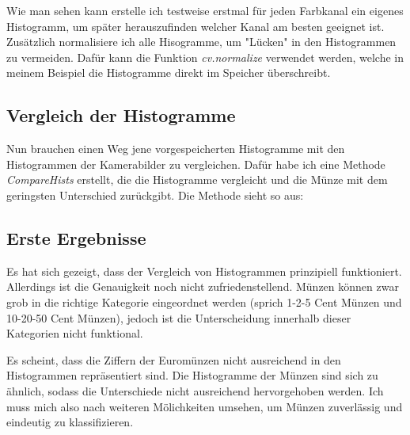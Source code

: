 Wie man sehen kann erstelle ich testweise erstmal für jeden Farbkanal ein eigenes Histogramm, um später herauszufinden welcher Kanal am besten geeignet ist. Zusätzlich normalisiere ich alle Hisogramme, um "Lücken" in den Histogrammen zu vermeiden. Dafür kann die Funktion \textit{cv.normalize} verwendet werden, welche in meinem Beispiel die Histogramme direkt im Speicher überschreibt.

\subsection{Vergleich der Histogramme}
Nun brauchen einen Weg jene vorgespeicherten Histogramme mit den Histogrammen der Kamerabilder zu vergleichen. Dafür habe ich eine Methode \textit{CompareHists} erstellt, die die Histogramme vergleicht und die Münze mit dem geringsten Unterschied zurückgibt. Die Methode sieht so aus:

\subsection{Erste Ergebnisse}
Es hat sich gezeigt, dass der Vergleich von Histogrammen prinzipiell funktioniert. Allerdings ist die Genauigkeit noch nicht zufriedenstellend. Münzen können zwar grob in die richtige Kategorie eingeordnet werden (sprich 1-2-5 Cent Münzen und 10-20-50 Cent Münzen), jedoch ist die Unterscheidung innerhalb dieser Kategorien nicht funktional.

Es scheint, dass die Ziffern der Euromünzen nicht ausreichend in den Histogrammen repräsentiert sind. Die Histogramme der Münzen sind sich zu ähnlich, sodass die Unterschiede nicht ausreichend hervorgehoben werden. Ich muss mich also nach weiteren Mölichkeiten umsehen, um Münzen zuverlässig und eindeutig zu klassifizieren.